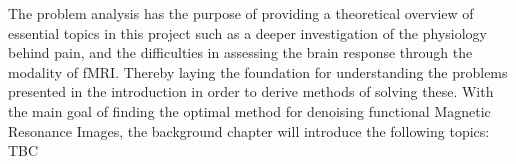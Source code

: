 
The problem analysis has the purpose of providing a theoretical overview of essential topics in this project such as a deeper investigation of the physiology behind pain, and the difficulties in assessing the brain response through the modality of fMRI. Thereby laying the foundation for understanding the problems presented in the introduction in order to derive methods of solving these.  With the main goal of finding the optimal method for denoising functional Magnetic Resonance Images, the background chapter will introduce the following topics: TBC

